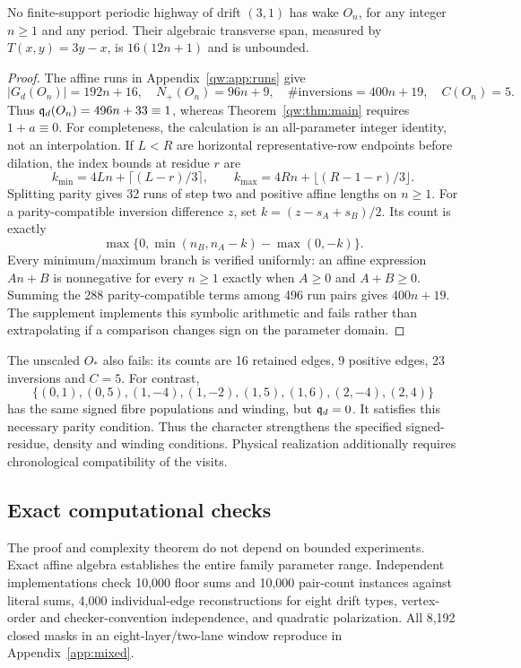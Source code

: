 \begin{corollary}\label{qw:cor:family}
No finite-support periodic highway of drift $(3,1)$ has wake $O_n$, for any
integer $n\ge1$ and any period. Their algebraic transverse span, measured by
$T(x,y)=3y-x$, is $16(12n+1)$ and is unbounded.
\end{corollary}
\begin{proof}
The affine runs in Appendix~\ref{qw:app:runs} give
\[
 |G_d(O_n)|=192n+16,\quad N_+(O_n)=96n+9,\quad
 \#\text{inversions}=400n+19,\quad C(O_n)=5.
\]
Thus $\mathfrak q_d(O_n)=496n+33\equiv1$, whereas Theorem~\ref{qw:thm:main} requires
$1+a\equiv0$. For completeness, the calculation is an all-parameter integer
identity, not an interpolation. If $L<R$ are horizontal representative-row
endpoints before dilation, the index bounds at residue $r$ are
\[
 k_{\min}=4Ln+\lceil(L-r)/3\rceil,\qquad
 k_{\max}=4Rn+\lfloor(R-1-r)/3\rfloor.
\]
Splitting parity gives 32 runs of step two and positive affine lengths on
$n\ge1$. For a parity-compatible inversion difference $z$, set
$k=(z-s_A+s_B)/2$. Its count is exactly
\begin{equation}
 \max\{0,\min(n_B,n_A-k)-\max(0,-k)\}.\label{qw:eq:affine-pair}
\end{equation}
Every minimum/maximum branch is verified uniformly: an affine expression
$An+B$ is nonnegative for every $n\ge1$ exactly when $A\ge0$ and $A+B\ge0$.
Summing the 288 parity-compatible terms among 496 run pairs gives $400n+19$.
The supplement implements this symbolic arithmetic and fails rather than
extrapolating if a comparison changes sign on the parameter domain.
\end{proof}

The unscaled $O_*$ also fails: its counts are 16 retained edges, 9 positive
edges, 23 inversions and $C=5$. For contrast,
\[
 \{(0,1),(0,5),(1,-4),(1,-2),(1,5),(1,6),(2,-4),(2,4)\}
\]
has the same signed fibre populations and winding, but $\mathfrak q_d=0$.
It satisfies this necessary parity condition. Thus the character strengthens
the specified signed-residue, density and winding conditions. Physical
realization additionally requires chronological compatibility of the visits.

\subsection{Exact computational checks}
The proof and complexity theorem do not depend on bounded experiments. Exact
affine algebra establishes the entire family parameter range. Independent implementations
check 10,000 floor sums and 10,000 pair-count instances against literal sums,
4,000 individual-edge reconstructions for eight drift types, vertex-order and
checker-convention independence, and quadratic polarization.
All 8,192 closed masks in an eight-layer/two-lane window reproduce in Appendix~\ref{app:mixed}.

